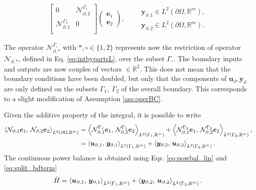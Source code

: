 \begin{subequations}
\begin{align}
\begin{bmatrix}
0 & \mathcal{N}_{\partial, 2}^{\Gamma_1} \\
\mathcal{N}_{\partial, 1}^{\Gamma_2} & 0\\
\end{bmatrix} \begin{pmatrix}
\bm{e}_1 \\ \bm{e}_2
\end{pmatrix}, \qquad
\begin{aligned}
\bm{y}_{\partial, 1} \in L^2(\partial\Omega, \mathbb{R}^{m}),\\
\bm{y}_{\partial, 2} \in L^2(\partial\Omega, \mathbb{R}^{m}).
\end{aligned}
\end{align}
\end{subequations}

 The operator $\mathcal{N}_{\partial, *}^{\Gamma_\circ}$ with $*, \circ \in \{1, 2\}$ represents now the restriction of operator $\mathcal{N}_{\partial, *}$, defined in Eq. \eqref{eq:intbypartsL}, over the subset $\Gamma_\circ$.  The boundary inputs and outputs are now couples of vectors $ \in \mathbb{R}^{2}$. This does not mean that the boundary conditions have been doubled, but only that the components of $\bm{u}_\partial, \bm{y}_\partial$ are only defined on the subsets $\Gamma_1, \; \Gamma_2$ of the overall boundary. This corresponds to a slight modification of Assumption \ref{ass:operBC}.
 
 
Given the additive property of the integral, it is possible to write
\begin{equation}\label{eq:split_bdterm}
\begin{aligned}
\inner[L^2(\partial \Omega, \mathbb{R}^m)]{\mathcal{N}_{\partial, 1}\bm{e}_1}{\mathcal{N}_{\partial, 2}\bm{e}_2} &= \inner[L^2(\Gamma_1, \mathbb{R}^m)]{\mathcal{N}_{\partial, 1}^{\Gamma_1}\bm{e}_1}{\mathcal{N}_{\partial, 2}^{\Gamma_1}\bm{e}_2} + \inner[L^2({\Gamma_2, \mathbb{R}^m})]{\mathcal{N}_{\partial, 1}^{\Gamma_2}\bm{e}_1}{\mathcal{N}_{\partial, 2}^{\Gamma_2}\bm{e}_2}, \\
&= \inner[L^2({\Gamma_1, \mathbb{R}^m})]{\bm{u}_{\partial, 1}}{\bm{y}_{\partial, 1}} + \inner[L^2({\Gamma_2, \mathbb{R}^m})]{\bm{y}_{\partial, 2}}{\bm{u}_{\partial, 2}}.
\end{aligned} 
\end{equation}
The continuous power balance is obtained using Eqs. \eqref{eq:powbal_lin} and \eqref{eq:split_bdterm}
\begin{equation}\label{eq:powbal_mixed}
	\dot{H} = \inner[L^2({\Gamma_1}, \mathbb{R}^m)]{\bm{u}_{\partial, 1}}{\bm{y}_{\partial, 1}} + \inner[L^2({\Gamma_2}, \mathbb{R}^m)]{\bm{y}_{\partial, 2}}{\bm{u}_{\partial, 2}}.
\end{equation}
 

